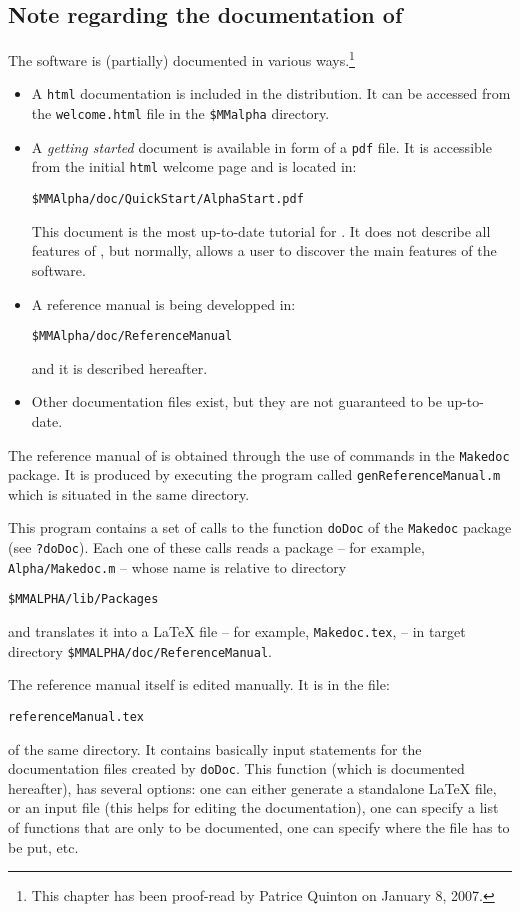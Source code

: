 \subsection{Note regarding the documentation of \MMAlfa{}}
\label{doc-makedoc}
The \MMAlfa{} software is (partially) documented in various
ways.\footnote{This chapter has been
proof-read by Patrice Quinton on January 8, 2007.}
\begin{itemize}
\item A \texttt{html} documentation is included in the distribution.
It can be accessed from the \texttt{welcome.html} file in the 
\texttt{\$MMalpha{}} directory. 
\item A {\em getting started} document is available in form of
a \texttt{pdf}
file. It is accessible from the initial \texttt{html} welcome
page and is located in:
\begin{verbatim} 
$MMAlpha/doc/QuickStart/AlphaStart.pdf
\end{verbatim} 
This document is the most up-to-date tutorial for \MMAlpha{}. It does not
describe all features of \MMAlpha{}, but normally, allows a user to
discover the main features of the software.
\item A reference manual is being developped in:
\begin{verbatim} 
$MMAlpha/doc/ReferenceManual
\end{verbatim}
and it is described hereafter.
\item Other documentation files exist, but they are not guaranteed to 
be up-to-date.
\end{itemize}

The reference manual of \MMALPHA{} is obtained through the use 
of commands in the \texttt{Makedoc} package. 
It is produced by executing the program called \texttt{genReferenceManual.m}
which is situated in the same directory.

This program contains a set of calls to the function \texttt{doDoc}
of the \texttt{Makedoc} package (see \texttt{?doDoc}). Each one of
these calls reads a package -- for example, \texttt{Alpha/Makedoc.m} --
whose name is relative to directory
\begin{verbatim} 
$MMALPHA/lib/Packages
\end{verbatim}
and translates it into a \LaTeX{} file -- for example, \texttt{Makedoc.tex}, --
in target directory \texttt{\$MMALPHA/doc/ReferenceManual}.

The reference manual itself is edited manually. It is in the 
file:
\begin{verbatim}
referenceManual.tex
\end{verbatim}
of the same directory. It contains
basically input statements for the documentation files created by 
\texttt{doDoc}. This function (which is documented hereafter), has
several options: one can either generate a standalone \LaTeX{} file, or
an input file (this helps for editing the documentation), one can 
specify a list of functions that are only to be documented, one can 
specify where the file has to be put, etc. 

